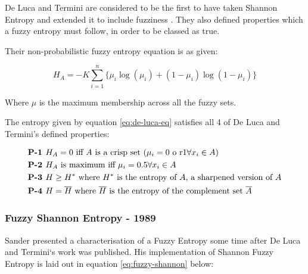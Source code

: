 De Luca and Termini are considered to be the first to have taken Shannon Entropy and extended it to include fuzziness \cite{DeLuca_Termini_1972}. They also defined properties which a fuzzy entropy must follow, in order to be classed as true.

Their non-probabilistic fuzzy entropy equation is as given:

\begin{equation}\label{eq:de-luca-eq}
  H_A = -K \displaystyle\sum_{i=1}^{n}{\{\mu_i\log(\mu_i) + (1 - \mu_i)\log(1 - \mu_i)\}}
\end{equation}

Where $\mu$ is the maximum membership across all the fuzzy sets.

The entropy given by equation \eqref{eq:de-luca-eq} satisfies all 4 of De Luca and Termini's defined properties:

  \begin{subequations} \label{eq:de-luca-cond}
    \begin{align}
      &\text{\textbf{P-1 }} H_A = 0 \text{ iff } A \text{ is a crisp set (}\mu_i = 0 \text{ o r} 1 \forall x_i \in A\text{)} \\
      &\text{\textbf{P-2 }} H_A \text{ is maximum iff }\mu_i = 0.5 \forall x_i \in A \\
      &\text{\textbf{P-3 }} H \geq H^\ast\text{ where }H^\ast\text{ is the entropy of }A\text{, a sharpened version of } A \\
      &\text{\textbf{P-4 }} H = \overline{H}\text{ where }\overline{H}\text{ is the entropy of the complement set }\overline{A}
    \end{align}
  \end{subequations}



\subsubsection{Fuzzy Shannon Entropy - 1989}

Sander \cite{Sander_1989} presented a characterisation of a Fuzzy Entropy some time after De Luca and Termini`s work was published. His implementation of Shannon Fuzzy Entropy is laid out in equation \eqref{eq:fuzzy-shannon} below:

